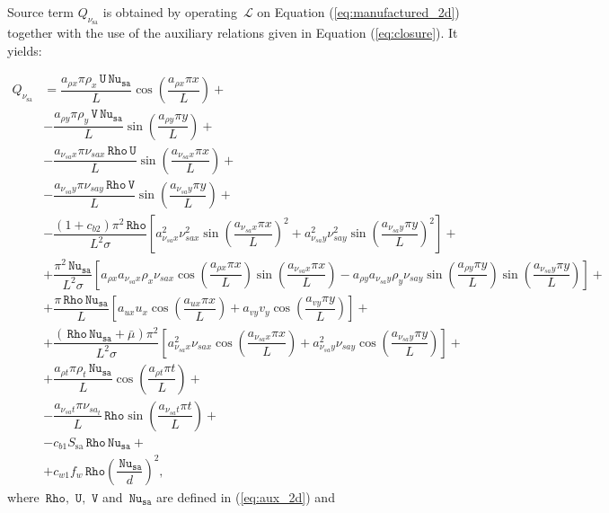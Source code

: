 \documentclass[10pt]{article}
\newcommand{\Rho}{\,\mathtt{Rho}}
\newcommand{\U}{\,\mathtt{U}}
\newcommand{\V}{\,\mathtt{V}}
\newcommand{\Nu}{\,\mathtt{Nu_{sa}}}
\newcommand{\Lo}{\,\mathcal{L}}
\newcommand{\sa}{\nu_{\mathrm{sa}}}
\newcommand{\bmu}{\bar{\mu}}
\begin{document}
Source term $Q_{\sa}$ is obtained by operating $\Lo$ on Equation  (\ref{eq:manufactured_2d}) together with the use of the  auxiliary relations given in Equation (\ref{eq:closure}). It yields:

\begin{equation}
 \begin{split}
  Q_{\sa} &= \dfrac{a_{\rho x} \pi \rho_x \U \Nu  }{L}\cos\left(\dfrac{a_{\rho x} \pi x}{L}\right)+ \\
&-\dfrac{a_{\rho y} \pi \rho_y \V \Nu }{L}\sin\left(\dfrac{a_{\rho y} \pi y}{L}\right)+ \\
&-\dfrac{a_{\nu_{sa} x} \pi \nu_{sa x} \Rho \U }{L}\sin\left(\dfrac{a_{\nu_{sa} x} \pi x}{L}\right)+ \\
&-\dfrac{a_{\nu_{sa} y} \pi \nu_{sa y} \Rho \V }{L}\sin\left(\dfrac{a_{\nu_{sa} y} \pi y}{L}\right)+ \\
&-\dfrac{(1+c_{b2}) \pi^2 \Rho}{L^2 \sigma}\left[a_{\nu_{sa} x}^2 \nu_{sa x}^2  \sin\left(\dfrac{a_{\nu_{sa} x} \pi x}{L}\right)^2+a_{\nu_{sa} y}^2 \nu_{sa y}^2  \sin\left(\dfrac{a_{\nu_{sa} y} \pi y}{L}\right)^2\right]+\\
&+\dfrac{\pi^2 \Nu}{ L^2\sigma}\left[a_{\rho x} a_{\nu_{sa} x} \rho_x \nu_{sa x}  \cos\left(\dfrac{a_{\rho x} \pi x}{L}\right)  \sin\left(\dfrac{a_{\nu_{sa} x} \pi x}{L}\right)-a_{\rho y} a_{\nu_{sa} y} \rho_y \nu_{sa y}  \sin\left(\dfrac{a_{\rho y} \pi y}{L}\right)  \sin\left(\dfrac{a_{\nu_{sa} y} \pi y}{L}\right)\right] +\\
 &+\dfrac{\pi \Rho \Nu}{L}\left[a_{ux} u_x  \cos\left(\dfrac{a_{ux} \pi x}{L}\right)+a_{vy} v_y  \cos\left(\dfrac{a_{vy} \pi y}{L}\right)\right] + \\
 &+\dfrac{(\Rho \Nu+\bmu) \pi^2}{L^2 \sigma}\left[a_{\nu_{sa} x}^2 \nu_{sa x}  \cos\left(\dfrac{a_{\nu_{sa} x} \pi x}{L}\right)+a_{\nu_{sa} y}^2 \nu_{sa y}  \cos\left(\dfrac{a_{\nu_{sa} y} \pi y}{L}\right)\right]+\\
&+ \dfrac{a_{\rho t} \pi \rho_t \Nu}{L} \cos\left(\dfrac{a_{\rho t} \pi t}{L}\right)+\\
&- \dfrac{a_{\nu_{sa}t} \pi \nu_{sa_t}}{L} \Rho \sin\left(\dfrac{a_{\nu_{sa} t} \pi t}{L}\right)+\\
&-c_{b1} S_{\mathrm{sa}} \Rho \Nu+\\
&+c_{w1} f_w \Rho \left(\dfrac{\Nu}{d}\right)^2,
 \end{split}
\end{equation}
where $\Rho,\, \U,\,\V$ and $\Nu$ are defined in (\ref{eq:aux_2d}) and
\end{document}
